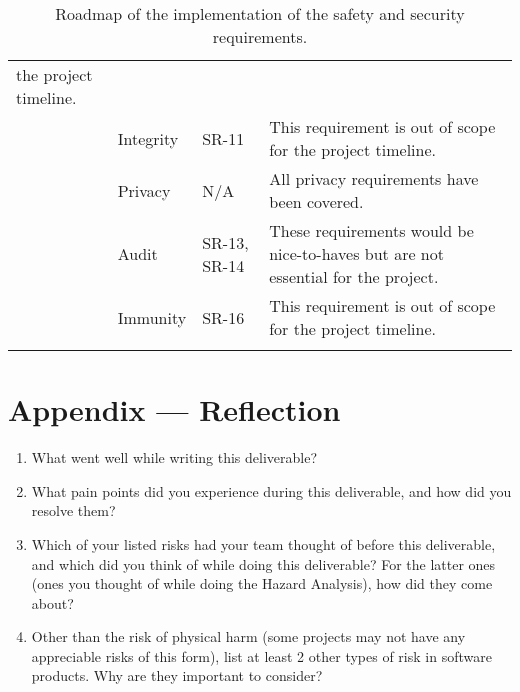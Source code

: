 \documentclass{article}
\begin{document}
\begin{longtable}[c]{|m{2cm}|m{2.6cm}|m{2cm}|m{3.8cm}|}
    the project timeline.\\
    \cline{2-4}
    & Integrity & SR-11 & This requirement is out of scope for the project
    timeline.\\
    \cline{2-4}
    & Privacy & N/A & All privacy requirements have been covered.\\
    \cline{2-4}
    & Audit & SR-13, SR-14 & These requirements would be nice-to-haves but are
    not essential for the project.\\
    \cline{2-4}
    & Immunity & SR-16 & This requirement is out of scope for the project
    timeline.\\
    \hline
    \caption{Roadmap of the implementation of the safety and security requirements.}
\end{longtable}

\newpage{}

\section*{Appendix --- Reflection}




\begin{enumerate}
    \item What went well while writing this deliverable? 
    \item What pain points did you experience during this deliverable, and how
    did you resolve them?
    \item Which of your listed risks had your team thought of before this
    deliverable, and which did you think of while doing this deliverable? For
    the latter ones (ones you thought of while doing the Hazard Analysis), how
    did they come about?
    \item Other than the risk of physical harm (some projects may not have any
    appreciable risks of this form), list at least 2 other types of risk in
    software products. Why are they important to consider?
\end{enumerate}
\end{document}
